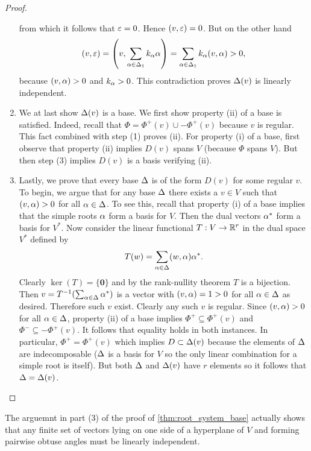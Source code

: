 \documentclass[12pt,reqno,oneside]{amsart}
\begin{document}
\begin{proof}
\begin{enumerate}
            from which it follows that $\varepsilon = 0$. Hence $(v,\varepsilon) = 0$. But on the other hand
            \[
                (v,\varepsilon) = \left(v,\sum_{\alpha \in \Delta_{1}}k_{\alpha}\alpha\right) = \sum_{\alpha \in \Delta_{1}}k_{\alpha}(v,\alpha) > 0,
            \]
            because $(v,\alpha) > 0$ and $k_{\alpha} > 0$. This contradiction proves $\Delta(v)$ is linearly independent.
            \item We at last show $\Delta(v)$ is a base. We first show property (ii) of a base is satisfied. Indeed, recall that $\Phi = \Phi^{+}(v) \cup -\Phi^{+}(v)$ because $v$ is regular. This fact combined with step (1) proves (ii). For property (i) of a base, first observe that property (ii) implies $D(v)$ spans $V$ (because $\Phi$ spans $V$). But then step (3) implies $D(v)$ is a basis verifying (ii).
            \item Lastly, we prove that every base $\Delta$ is of the form $D(v)$ for some regular $v$. To begin, we argue that for any base $\Delta$ there exists a $v \in V$ such that $(v,\alpha) > 0$ for all $\alpha \in \Delta$. To see this, recall that property (i) of a base implies that the simple roots $\alpha$ form a basis for $V$. Then the dual vectors $\alpha^{\ast}$ form a basis for $V^{\ast}$. Now consider the linear functional $T:V \to \mathbb{R}^{r}$ in the dual space $V^{\ast}$ defined by
            \[
                T(w) = \sum_{\alpha \in \Delta}(w,\alpha)\alpha^{\ast}.
            \]
            Clearly $\ker(T) = \{\mathbf{0}\}$ and by the rank-nullity theorem $T$ is a bijection. Then $v = T^{-1}(\sum_{\alpha \in \Delta}\alpha^{\ast})$ is a vector with $(v,\alpha) = 1 > 0$ for all $\alpha \in \Delta$ as desired. Therefore such $v$ exist. Clearly any such $v$ is regular. Since $(v,\alpha) > 0$ for all $\alpha \in \Delta$, property (ii) of a base implies $\Phi^{+} \subseteq \Phi^{+}(v)$ and $\Phi^{-} \subseteq -\Phi^{+}(v)$. It follows that equality holds in both instances. In particular, $\Phi^{+} = \Phi^{+}(v)$ which implies $D \subset \Delta(v)$ because the elements of $\Delta$ are indecomposable ($\Delta$ is a basis for $V$ so the only linear combination for a simple root is itself). But both $\Delta$ and $\Delta(v)$ have $r$ elements so it follows that $\Delta = \Delta(v)$.
        \end{enumerate}
    \end{proof}

    \begin{remark}\label{rem:obtuse_independence}
        The arguemnt in part (3) of the proof of \cref{thm:root_system_base} actually shows that any finite set of vectors lying on one side of a hyperplane of $V$ and forming pairwise obtuse angles must be linearly independent.
    \end{remark}
\end{document}

